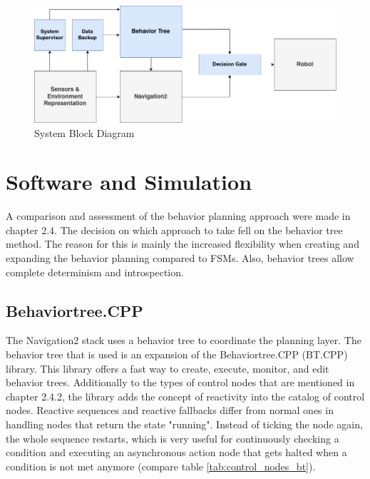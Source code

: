 \begin{center}
\begin{figure}[ht]   
	\includegraphics[width=1.0\textwidth]{images/block_diagram.png}
	\caption{System Block Diagram}
	\label{fig:block_diagram}
\end{figure}
\end{center}


\section{Software and Simulation}
A comparison and assessment of the behavior planning approach were made in chapter 2.4. The decision on which approach to take fell on the behavior tree method. The reason for this is mainly the increased flexibility when creating and expanding the behavior planning compared to FSMs. Also, behavior trees allow complete determinism and introspection.

\subsection{Behaviortree.CPP}
The Navigation2 stack uses a behavior tree to coordinate the planning layer. The behavior tree that is used is an expansion of the Behaviortree.CPP (BT.CPP) library. This library offers a fast way to create, execute, monitor, and edit behavior trees. 
Additionally to the types of control nodes that are mentioned in chapter 2.4.2, the library adds the concept of reactivity into the catalog of control nodes. Reactive sequences and reactive fallbacks differ from normal ones in handling nodes that return the state "running". Instead of ticking the node again, the whole sequence restarts, which is very useful for continuously checking a condition and executing an asynchronous action node that gets halted when a condition is not met anymore (compare table \ref{tab:control_nodes_bt}). 

